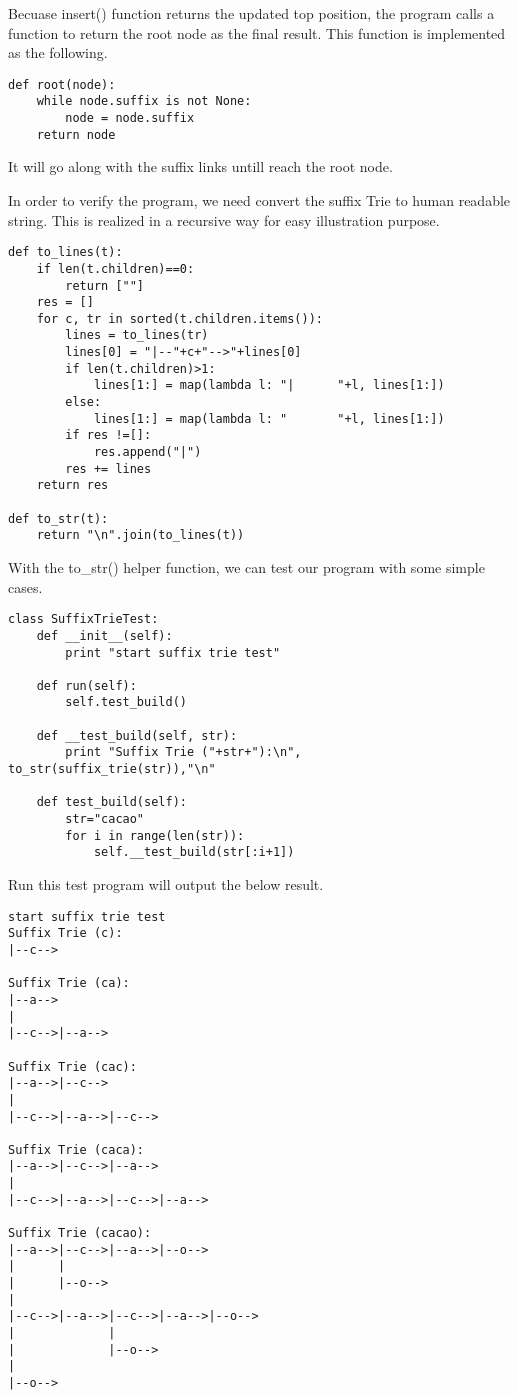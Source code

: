 \documentclass{article}
\begin{document}
Becuase insert() function returns the updated top position, the program calls
a function to return the root node as the final result. This function is implemented
as the following.

\begin{lstlisting}
def root(node):
    while node.suffix is not None:
        node = node.suffix
    return node
\end{lstlisting}

It will go along with the suffix links untill reach the root node.

In order to verify the program, we need convert the suffix Trie to human readable
string. This is realized in a recursive way for easy illustration purpose.

\begin{lstlisting}
def to_lines(t):
    if len(t.children)==0:
        return [""]
    res = []
    for c, tr in sorted(t.children.items()):
        lines = to_lines(tr)
        lines[0] = "|--"+c+"-->"+lines[0]
        if len(t.children)>1:
            lines[1:] = map(lambda l: "|      "+l, lines[1:])
        else:
            lines[1:] = map(lambda l: "       "+l, lines[1:])
        if res !=[]:
            res.append("|")
        res += lines
    return res

def to_str(t):
    return "\n".join(to_lines(t))
\end{lstlisting}

With the to\_str() helper function, we can test our program with
some simple cases.

\begin{lstlisting}
class SuffixTrieTest:
    def __init__(self):
        print "start suffix trie test"

    def run(self):
        self.test_build()

    def __test_build(self, str):
        print "Suffix Trie ("+str+"):\n", to_str(suffix_trie(str)),"\n"

    def test_build(self):
        str="cacao"
        for i in range(len(str)):
            self.__test_build(str[:i+1])
\end{lstlisting}

Run this test program will output the below result.

\begin{verbatim}
start suffix trie test
Suffix Trie (c):
|--c--> 

Suffix Trie (ca):
|--a-->
|
|--c-->|--a--> 

Suffix Trie (cac):
|--a-->|--c-->
|
|--c-->|--a-->|--c--> 

Suffix Trie (caca):
|--a-->|--c-->|--a-->
|
|--c-->|--a-->|--c-->|--a--> 

Suffix Trie (cacao):
|--a-->|--c-->|--a-->|--o-->
|      |
|      |--o-->
|
|--c-->|--a-->|--c-->|--a-->|--o-->
|             |
|             |--o-->
|
|--o--> 
\end{verbatim}
\end{document}
